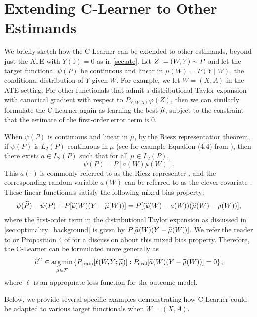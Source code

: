 \section{Extending C-Learner to Other Estimands}\label{sec:extension}
\label{sec:other_estimands}




We briefly sketch how the C-Learner can be extended to other estimands, beyond just the ATE with $Y(0)=0$ as in \cref{sec:ate}. 
Let $Z:= (W,Y)\sim P$ and let the target functional  $\psi(P)$ be continuous and linear in $\mu(W)=P(Y\mid W)$, the conditional distribution of $Y$ given $W$. For example, we let $W = (X,A)$ in the ATE setting. %
For other functionals 
that admit a distributional Taylor expansion with canonical gradient with respect to $P_{Y,W|X}$, $\varphi(Z)$, then we can similarly
formulate the C-Learner again as 
learning the best $\widehat{\mu}$, subject to the constraint that the estimate of the first-order error term is 0. 

When $\psi(P)$ is continuous and linear in $\mu$,
by the Riesz representation theorem, 
if $\psi(P)$ is $L_2(P)$-continuous in $\mu$ (see for example Equation (4.4) from \cite{Newey94}),
then 
there exists $a\in L_2(P)$ such that for all $\mu\in L_2(P)$, 
$$
\psi(P) = P[a(W)\mu(W)].
$$
This $a(\cdot)$ is commonly referred to as the Riesz representer \citep{chernozhukov2021automatic}, and the corresponding random variable $a(W)$ can be referred to as the clever covariate \citep{VanDerLaanRo11}. These linear functionals satisfy the following mixed bias property: 
$$ 
\psi(\widehat{P}) - \psi(P) + P[\widehat{a}(W)(Y-\widehat{\mu}(W))] = P[(\widehat{a}(W) - a(W))(\widehat{\mu}(W) - \mu(W))],
$$
where the first-order term in the distributional Taylor expansion as discussed
in \cref{sec:optimality_background} 
is given by $P[\widehat{a}(W)(Y-\widehat{\mu}(W))]$. We refer the reader to \cite{chernozhukov2021automatic} or Proposition 4 of \cite{Newey94} for a discussion about this mixed bias property. 
Therefore, the C-Learner can be formulated more generally as
\begin{equation*}\label{eq:c-learner_general}
\widehat{\mu}^C\in\mathop{\rm argmin}_{\widetilde{\mu}\in\mathcal F} 
\left\{ P_{\rm train}[\ell(W,Y;\widetilde{\mu})] : P_{\rm eval} [\widehat{a}(W)(Y-\widetilde{\mu}(W))]=0
\right\},
\end{equation*}
where $\ell$ is an appropriate loss function for the outcome model.  

Below, we provide several specific examples demonstrating how C-Learner could be adapted to various target functionals when $W = (X,A)$. 
